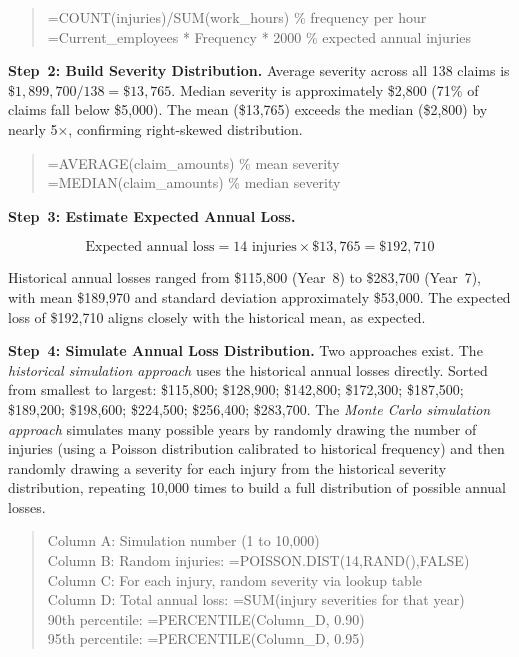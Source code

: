 \documentclass[11pt,openany]{book}
\newenvironment{excelblock}%
  {\begin{quote}\small\ttfamily\setlength{\parskip}{2pt}}%
  {\end{quote}}
\begin{document}
\begin{excelblock}
=COUNT(injuries)/SUM(work\_hours)       \% frequency per hour\\
=Current\_employees * Frequency * 2000  \% expected annual injuries
\end{excelblock}

\textbf{Step~2: Build Severity Distribution.} Average severity across all 138
claims is \(\$1{,}899{,}700 / 138 = \$13{,}765\). Median severity is
approximately \$2,800 (71\% of claims fall below \$5,000). The mean
(\$13,765) exceeds the median (\$2,800) by nearly 5$\times$, confirming
right-skewed distribution.

\begin{excelblock}
=AVERAGE(claim\_amounts)  \% mean severity\\
=MEDIAN(claim\_amounts)   \% median severity
\end{excelblock}

\textbf{Step~3: Estimate Expected Annual Loss.}

\[
  \text{Expected annual loss} = 14 \text{ injuries} \times \$13{,}765
  = \$192{,}710
\]

Historical annual losses ranged from \$115,800 (Year~8) to \$283,700 (Year~7),
with mean \$189,970 and standard deviation approximately \$53,000. The expected
loss of \$192,710 aligns closely with the historical mean, as expected.

\textbf{Step~4: Simulate Annual Loss Distribution.} Two approaches exist.
The \emph{historical simulation approach} uses the historical annual losses
directly. Sorted from smallest to largest: \$115,800; \$128,900; \$142,800;
\$172,300; \$187,500; \$189,200; \$198,600; \$224,500; \$256,400; \$283,700.
The \emph{Monte Carlo simulation approach} simulates many possible years by
randomly drawing the number of injuries (using a Poisson distribution calibrated
to historical frequency) and then randomly drawing a severity for each injury
from the historical severity distribution, repeating 10,000 times to build a
full distribution of possible annual losses.

\begin{excelblock}
Column A: Simulation number (1 to 10,000)\\
Column B: Random injuries: =POISSON.DIST(14,RAND(),FALSE)\\
Column C: For each injury, random severity via lookup table\\
Column D: Total annual loss: =SUM(injury severities for that year)\\
\medskip
90th percentile: =PERCENTILE(Column\_D, 0.90)\\
95th percentile: =PERCENTILE(Column\_D, 0.95)
\end{excelblock}
\end{document}
